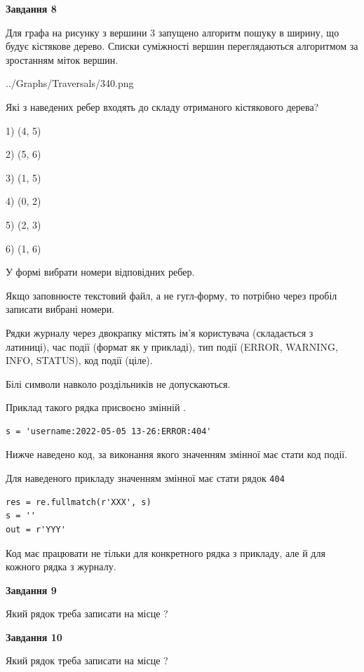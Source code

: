 \documentclass[12pt, ukrainian]{article}
\def\code#1{\Verb!#1!}
\begin{document}
{\begin {large}
{\begin {center}\textbf{Завдання 8}\end {center}}\par
Для графа на рисунку з вершини 3 запущено алгоритм пошуку в ширину, що будує кістякове дерево. Списки суміжності вершин переглядаються алгоритмом за зростанням міток вершин.\par
\begin{center}
	{../Graphs/Traversals/340.png}
\end{center}
\par Які з наведених ребер входять до складу отриманого кістякового дерева?\par
1) (4, 5)\par
2) (5, 6)\par
3) (1, 5)\par
4) (0, 2)\par
5) (2, 3)\par
6) (1, 6)\par
{\vskip 15pt} У формі вибрати номери відповідних ребер.


Якщо заповнюєте текстовий файл, а не гугл-форму, то потрібно через пробіл записа\-ти вибрані номери.\par
\newpage


Рядки журналу через двокрапку містять ім'я користувача (складається з латиниці), час події (фор\-мат як у прикладі), тип події (ERROR, WARNING, INFO, STATUS), код події (ціле).

Білі символи навколо роздільників не допускаються.

Приклад такого рядка присвоєно змінній .



\begin{verbatim}
s = 'username:2022-05-05 13-26:ERROR:404'
\end{verbatim}


Нижче наведено код, за виконання якого значенням змінної  має стати код події.

Для наведеного прикладу значенням змінної  має стати рядок \code{404}



\begin{verbatim}
res = re.fullmatch(r'XXX', s)
s = ''
out = r'YYY'
\end{verbatim}


Код має працювати не тільки для конкретного рядка з прикладу, але й для кожного рядка з журналу.

{\begin {center}\textbf{Завдання 9}\end {center}}\par
Який рядок треба записати на місце  ?\par
\vspace{5mm}


{\begin {center}\textbf{Завдання 10}\end {center}}\par
Який рядок треба записати на місце  ?\par


\newpage


\end {large}}
\end{document}
